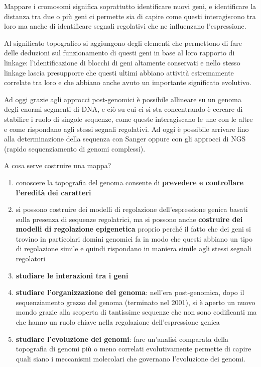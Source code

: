 \documentclass[11pt]{book}
\begin{document}
Mappare i cromosomi significa soprattutto identificare nuovi geni, e identificare la distanza tra due o più geni ci permette sia di capire come questi interagiscono tra loro ma anche di identificare segnali regolativi che ne influenzano l’espressione.

Al significato topografico si aggiungono degli elementi che permettono di fare delle deduzioni sul funzionamento di questi geni in base al loro rapporto di linkage: l’identificazione di blocchi di geni altamente conservati e nello stesso linkage lascia presupporre che questi ultimi abbiano attività estremamente correlate tra loro e che abbiano anche avuto un importante significato evolutivo.

Ad oggi grazie agli approcci post-genomici è possibile allineare su un genoma degli enormi segmenti di DNA, e ciò su cui ci si sta concentrando è cercare di stabilire i ruolo di singole sequenze, come queste interagiscano le une con le altre e come rispondano agli stessi segnali regolativi. Ad oggi è possibile arrivare fino alla determinazione della sequenza con Sanger oppure con gli approcci di NGS (rapido sequenziamento di genomi complessi).

A cosa serve costruire una mappa?
\begin{enumerate}
\item conoscere la topografia del genoma consente di \textbf{prevedere e controllare l’eredità dei caratteri}
\item si possono costruire dei modelli di regolazione dell’espressione genica basati sulla presenza di sequenze regolatrici, ma si possono anche \textbf{costruire dei modelli di regolazione epigenetica} proprio perché il fatto che dei geni si trovino in particolari domini genomici fa in modo che questi abbiano un tipo di regolazione simile e quindi rispondano in maniera simile agli stessi segnali regolatori
\item \textbf{studiare le interazioni tra i geni}
\item \textbf{studiare l’organizzazione del genoma}: nell’era post-genomica, dopo il sequenziamento grezzo del genoma (terminato nel 2001), si è aperto un nuovo mondo grazie alla scoperta di tantissime sequenze che non sono codificanti ma che hanno un ruolo chiave nella regolazione dell’espressione genica
\item \textbf{studiare l’evoluzione dei genomi}: fare un’analisi comparata della topografia di genomi più o meno correlati evolutivamente permette di capire quali siano i meccanismi molecolari che governano l’evoluzione dei genomi.
\end{enumerate}
\end{document}
